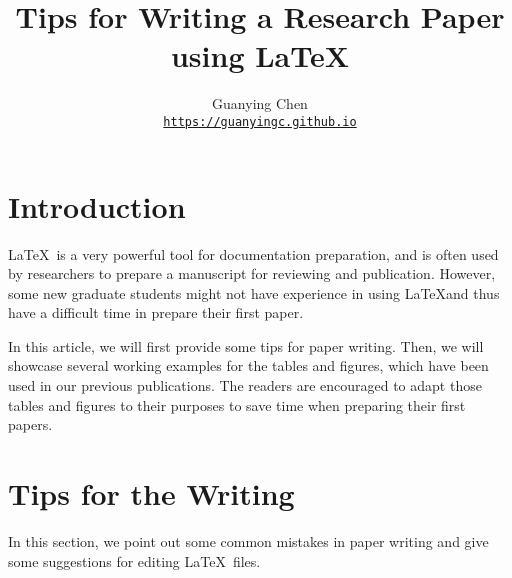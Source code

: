 \documentclass[10pt,twocolumn,letterpaper]{article}
\begin{document}
\title{Tips for Writing a Research Paper using \LaTeX}

\author{Guanying Chen \\
{\tt\small \url{https://guanyingc.github.io}}
}
\onecolumn
\maketitle
{
    \hypersetup{linkcolor=black}
    \tableofcontents
}



\vspace{7em}

\section{Introduction}
\label{sec:intro}
\LaTeX\ is a very powerful tool for documentation preparation, and is often used by researchers to prepare a manuscript for reviewing and publication. 
However, some new graduate students might not have experience in using \LaTeX and thus have a difficult time in prepare their first paper. 

In this article, we will first provide some tips for paper writing.  
Then, we will showcase several working examples for the tables and figures, which have been used in our previous publications. The readers are encouraged to adapt those tables and figures to their purposes to save time when preparing their first papers.

\twocolumn

\section{Tips for the Writing}
In this section, we point out some common mistakes in paper writing and give some suggestions for editing \LaTeX\ files.
\end{document}
